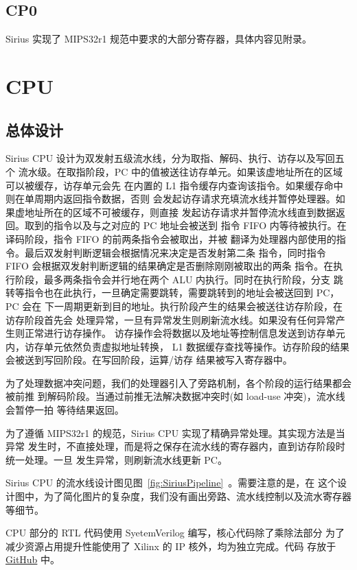 \documentclass[blue,normal,cn,hide]{elegantbook}
\begin{document}
\section{CP0}

Sirius 实现了 MIPS32r1 规范中要求的大部分寄存器，具体内容见附录。

\chapter{CPU}

\section{总体设计}

Sirius CPU 设计为双发射五级流水线，分为取指、解码、执行、访存以及写回五个
流水级。在取指阶段，PC 中的值被送往访存单元。如果该虚地址所在的区域可以被缓存，访存单元会先
在内置的 L1 指令缓存内查询该指令。如果缓存命中则在单周期内返回指令数据，否则
会发起访存请求充填流水线并暂停处理器。如果虚地址所在的区域不可被缓存，则直接
发起访存请求并暂停流水线直到数据返回。取到的指令以及与之对应的 PC 地址会被送到
指令 FIFO 内等待被执行。在译码阶段，指令 FIFO 的前两条指令会被取出，并被
翻译为处理器内部使用的指令。最后双发射判断逻辑会根据情况来决定是否发射第二条
指令，同时指令 FIFO 会根据双发射判断逻辑的结果确定是否删除刚刚被取出的两条
指令。在执行阶段，最多两条指令会并行地在两个 ALU 内执行。同时在执行阶段，分支
跳转等指令也在此执行，一旦确定需要跳转，需要跳转到的地址会被送回到 PC，PC 会在
下一周期更新到目的地址。执行阶段产生的结果会被送往访存阶段，在访存阶段首先会
处理异常，一旦有异常发生则刷新流水线。如果没有任何异常产生则正常进行访存操作。
访存操作会将数据以及地址等控制信息发送到访存单元内，访存单元依然负责虚拟地址转换，
L1 数据缓存查找等操作。访存阶段的结果会被送到写回阶段。在写回阶段，运算/访存
结果被写入寄存器中。

为了处理数据冲突问题，我们的处理器引入了旁路机制，各个阶段的运行结果都会被前推
到解码阶段。当通过前推无法解决数据冲突时(如 load-use 冲突)，流水线会暂停一拍
等待结果返回。

为了遵循 MIPS32r1 的规范，Sirius CPU 实现了精确异常处理。其实现方法是当异常
发生时，不直接处理，而是将之保存在流水线的寄存器内，直到访存阶段时统一处理。一旦
发生异常，则刷新流水线更新 PC。

Sirius CPU 的流水线设计图见图~\ref{fig:SiriusPipeline}~。需要注意的是，在
这个设计图中，为了简化图片的复杂度，我们没有画出旁路、流水线控制以及流水寄存器
等细节。

CPU 部分的 RTL 代码使用 SyetemVerilog 编写，核心代码除了乘除法部分
为了减少资源占用提升性能使用了 Xilinx 的 IP 核外，均为独立完成。代码
存放于 \href{https://github.com/name1e5s/Sirius}{GitHub} 中。
\end{document}
